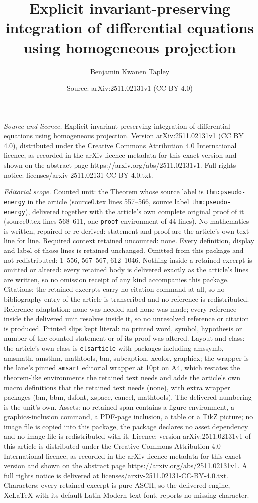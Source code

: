\documentclass[10pt,a4paper]{amsart}
\title[Explicit invariant-preserving integration of differential eq]{Explicit invariant-preserving integration of differential equations using homogeneous projection}
\author{Benjamin Kwanen Tapley}
\date{Source: arXiv:2511.02131v1 (CC BY 4.0)}
\begin{document}
\maketitle

\noindent\emph{Source and licence.} Explicit invariant-preserving integration of differential equations using homogeneous projection. Version arXiv:2511.02131v1 (CC BY 4.0), distributed under the Creative Commons Attribution 4.0 International licence, as recorded in the arXiv licence metadata for this exact version and shown on the abstract page https://arxiv.org/abs/2511.02131v1. Full rights notice: licenses/arxiv-2511.02131-CC-BY-4.0.txt.\par\smallskip

\noindent\textit{Editorial scope.} Counted unit: the Theorem whose source label is \texttt{thm:pseudo-energy} in the article (source0.tex lines 557--566, source label \texttt{thm:pseudo-energy}), delivered together with the article's own complete original proof of it (source0.tex lines 568--611, one \texttt{proof} environment of 44 lines). No mathematics is written, repaired or re-derived: statement and proof are the article's own text line for line. Required context retained uncounted: none. Every definition, display and label of those lines is retained unchanged. Omitted from this package and not redistributed: 1--556, 567--567, 612--1046. Nothing inside a retained excerpt is omitted or altered: every retained body is delivered exactly as the article's lines are written, so no omission receipt of any kind accompanies this package. Citations: the retained excerpts carry no citation command at all, so no bibliography entry of the article is transcribed and no reference is redistributed. Reference adaptation: none was needed and none was made; every reference inside the delivered unit resolves inside it, so no unresolved reference or citation is produced. Printed slips kept literal: no printed word, symbol, hypothesis or number of the counted statement or of its proof was altered. Layout and class: the article's own class is \texttt{elsarticle} with packages including amssymb, amsmath, amsthm, mathtools, bm, subcaption, xcolor, graphicx; the wrapper is the lane's pinned \texttt{amsart} editorial wrapper at 10pt on A4, which restates the theorem-like environments the retained text needs and adds the article's own macro definitions that the retained text needs (none), with extra wrapper packages (bm, bbm, dsfont, xspace, cancel, mathtools). The delivered numbering is the unit's own. Assets: no retained span contains a figure environment, a graphics-inclusion command, a PDF-page inclusion, a table or a TikZ picture; no image file is copied into this package, the package declares no asset dependency and no image file is redistributed with it. Licence: version arXiv:2511.02131v1 of this article is distributed under the Creative Commons Attribution 4.0 International licence, as recorded in the arXiv licence metadata for this exact version and shown on the abstract page https://arxiv.org/abs/2511.02131v1. A full rights notice is delivered at licenses/arxiv-2511.02131-CC-BY-4.0.txt. Characters: every retained excerpt is pure ASCII, so the delivered engine, XeLaTeX with its default Latin Modern text font, reports no missing character.
\end{document}
